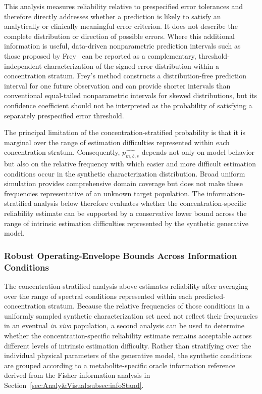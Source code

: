 This analysis measures reliability relative to prespecified error tolerances and therefore directly addresses whether a prediction is likely to satisfy an analytically or clinically meaningful error criterion. It does not describe the complete distribution or direction of possible errors. Where this additional information is useful, data-driven nonparametric prediction intervals such as those proposed by Frey~\cite{Frey2013} can be reported as a complementary, threshold-independent characterization of the signed error distribution within a concentration stratum. Frey's method constructs a distribution-free prediction interval for one future observation and can provide shorter intervals than conventional equal-tailed nonparametric intervals for skewed distributions, but its confidence coefficient should not be interpreted as the probability of satisfying a separately prespecified error threshold.

The principal limitation of the concentration-stratif\-ied probability is that it is marginal over the range of estimation difficulties represented within each concentration stratum. Consequently, $\hat{p_{m,b,s}}$ depends not only on model behavior but also on the relative frequency with which easier and more difficult estimation conditions occur in the synthetic characterization distribution. Broad uniform simulation provides comprehensive domain coverage but does not make these frequencies representative of an unknown target population. The information-stratified analysis below therefore evaluates whether the concentration-specific reliability estimate can be supported by a conservative lower bound across the range of intrinsic estimation difficulties represented by the synthetic generative model.

\subsubsection{Robust Operating-Envelope Bounds Across Information Conditions}
\label{sec:Reg:subsec:pred_intervals:subsubsec:robust op env}
The concentration-stratified analysis above estimates reliability after averaging over the range of spectral conditions represented within each predicted-concentration stratum. Because the relative frequencies of those conditions in a uniformly sampled synthetic characterization set need not reflect their frequencies in an eventual \textit{in vivo} population, a second analysis can be used to determine whether the concentration-specific reliability estimate remains acceptable across different levels of intrinsic estimation difficulty. Rather than stratifying over the individual physical parameters of the generative model, the synthetic conditions are grouped according to a metabolite-specific oracle information reference derived from the Fisher information analysis in Section~\ref{sec:Analy&Visual:subsec:infoStand}.

